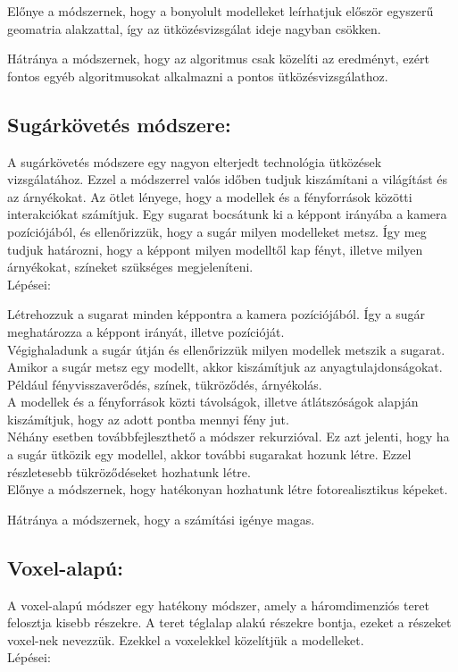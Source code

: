 Előnye a módszernek, hogy a bonyolult modelleket leírhatjuk először egyszerű geomatria alakzattal, így az ütközésvizsgálat ideje nagyban csökken.

Hátránya a módszernek, hogy az algoritmus csak közelíti az eredményt, ezért fontos egyéb algoritmusokat alkalmazni a pontos ütközésvizsgálathoz.

\subsection{Sugárkövetés módszere:}
A sugárkövetés módszere egy nagyon elterjedt technológia ütközések vizsgálatához. Ezzel a módszerrel valós időben tudjuk kiszámítani a világítást és az árnyékokat.
Az ötlet lényege, hogy a modellek és a fényforrások közötti interakciókat számítjuk. Egy sugarat bocsátunk ki a képpont irányába a kamera pozíciójából, és ellenőrizzük, hogy a sugár milyen modelleket metsz.
Így meg tudjuk határozni, hogy a képpont milyen modelltől kap fényt, illetve milyen árnyékokat, színeket szükséges megjeleníteni.
\\
Lépései:

\textbullet Létrehozzuk a sugarat minden képpontra a kamera pozíciójából. Így a sugár meghatározza a képpont irányát, illetve pozícióját.\\

\textbullet Végighaladunk a sugár útján és ellenőrizzük milyen modellek metszik a sugarat.\\

\textbullet Amikor a sugár metsz egy modellt, akkor kiszámítjuk az anyagtulajdonságokat. Például fényvisszaverődés, színek, tükröződés, árnyékolás.\\

\textbullet A modellek és a fényforrások közti távolságok, illetve átlátszóságok alapján kiszámítjuk, hogy az adott pontba mennyi fény jut.\\

\textbullet Néhány esetben továbbfejleszthető a módszer rekurzióval. Ez azt jelenti, hogy ha a sugár ütközik egy modellel, akkor további sugarakat hozunk létre. Ezzel részletesebb tükröződéseket hozhatunk létre.\\

Előnye a módszernek, hogy hatékonyan hozhatunk létre fotorealisztikus képeket.

Hátránya a módszernek, hogy a számítási igénye magas.


\subsection{Voxel-alapú:}
A voxel-alapú módszer egy hatékony módszer, amely a háromdimenziós teret felosztja kisebb részekre. A teret téglalap alakú részekre bontja, ezeket a részeket voxel-nek nevezzük.
Ezekkel a voxelekkel közelítjük a modelleket.
\\
Lépései:

